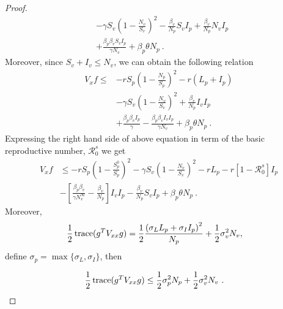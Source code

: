 \begin{proof}
\begin{align*}
				& -
				\gamma S_v
				\left(
					1 - 
					\frac{N_v}{S_v}
				\right) ^ 2 - 
				\frac{\beta_v}{N_p} S_v I_p + 
				\frac{\beta_v}{N_p} N_v I_p
			\\
				& +
				\frac{\beta_p\beta_v S_v I_p}{\gamma N_v} + 
				\beta_p \theta N_p \ .
	\end{align*}
	Moreover, since $S_v+I_v\leq N_v$, we can obtain the following relation
	\begin{align*}
		V_x f 
			\leq &
				- r S_p 
				\left(
					1 - 
					\frac{N_p}{S_p}
				\right) ^ 2 - 
				r (L_p + I_p)
			\\
			&-
				\gamma S_v
				\left(1 - 
					\frac{N_v}{S_v}
				\right) ^ 2 + 
				\frac{\beta_v}{N_p} I_v I_p
			\\
			&+
				\frac{\beta_p\beta_v I_p}{\gamma} - 
				\frac{\beta_p\beta_v I_v I_p}{\gamma N_v} + 
				\beta_p \theta N_p \ .
	\end{align*}
%
	Expressing the right hand side of above equation in term of the basic 
	reproductive number, $\mathcal{R}^s_0$ we get
	\begin{align*}
		V_x f 
			&\leq
				-rS_p 
				\left(
					1 - 
					\frac{S_p^0}{S_p}
				\right) ^ 2 -
				\gamma S_v
				\left(
					1 - 
					\frac{N_v}{S_v}
				\right) ^ 2 - 
				r L_p - r
				\left[
					1 - \mathcal{R}^s_0
				\right] I_p
			\\
			&-
				\left[
					\frac{\beta_p\beta_v}{\gamma N^\infty_v} - 
					\frac{\beta_v}{N_p} 
				\right] I_v I_p - 
				\frac{\beta_v}{N_p} S_v I_p + 
				\beta_p \theta N_p \ .
	\end{align*}
	Moreover,
	\begin{align*}
		\frac{1}{2}
		\operatorname{trace}(g ^ TV_{xx} g) 
		&=
		\frac{1}{2} 
		\frac{
			\left(
				 \sigma_L L_p + \sigma_I I_p
			\right) ^ 2
		}{N_p} 
		+ 
		\frac{1}{2} \sigma_v ^ 2 N_v,
	\end{align*}
	define $\sigma_p = \max\{\sigma_L,\sigma_I\}$, then
	
		\begin{align*}
		\frac{1}{2}
		\operatorname{trace}(g ^ TV_{xx} g) 
		&\leq
		\frac{1}{2} 
		\sigma_p ^ 2 N_p +  
		\frac{1}{2} \sigma_v ^ 2 N_v \ .
	\end{align*}
	

\end{proof}
